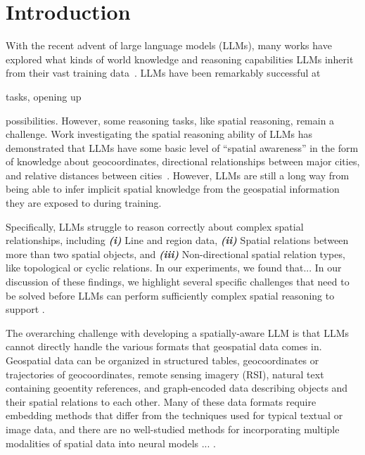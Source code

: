 \section{Introduction}

\label{section:introduction}

With the recent advent of large language models (LLMs), many works have explored what kinds of world knowledge and reasoning capabilities LLMs inherit from their vast training data~\cite{Mai2023, Bhandari2023, Qi2023}.
%
LLMs have been remarkably successful at 

tasks, opening up 

possibilities.
%
However, some reasoning tasks, like spatial reasoning, remain a challenge.
%
%
Work investigating the spatial reasoning ability of LLMs has demonstrated that LLMs have some basic level of ``spatial awareness'' in the form of knowledge about geocoordinates, directional relationships between major cities, and relative distances between cities~\cite{Bhandari2023, Qi2023}.
However, LLMs are still a long way from being able to infer implicit spatial knowledge from the geospatial information they are exposed to during training.


Specifically, LLMs struggle to reason correctly about complex spatial relationships, including
%
\textit{\textbf{(i)}} Line and region data,
\textit{\textbf{(ii)}} Spatial relations between more than two spatial objects, and 
\textit{\textbf{(iii)}} Non-directional spatial relation types, like topological or cyclic relations.
%
In our experiments, we found that... 
%
In our discussion of these findings, we highlight several specific challenges that need to be solved before LLMs can perform sufficiently complex spatial reasoning to support .


The overarching challenge with developing a spatially-aware LLM is that LLMs cannot directly handle the various formats that geospatial data comes in.
Geospatial data can be organized in structured tables, geocoordinates or trajectories of geocoordinates, remote sensing imagery (RSI), natural text containing geoentity references, and graph-encoded data describing objects and their spatial relations to each other.
%
Many of these data formats require embedding methods that differ from the techniques used for typical textual or image data, and there are no well-studied methods for incorporating multiple modalities of spatial data into neural models ...  \cite{Trappolini2023}.


